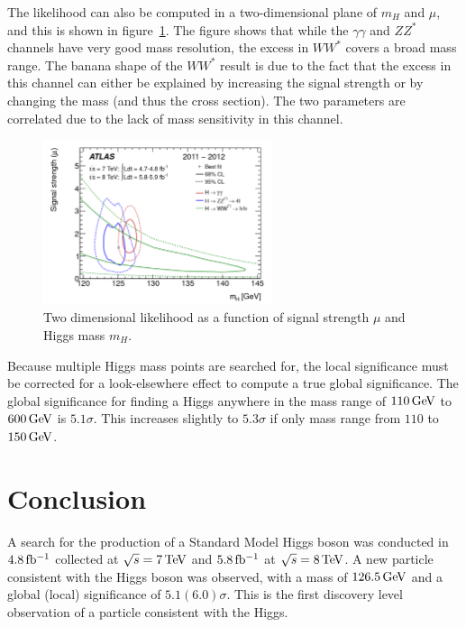The likelihood can also be computed in a two-dimensional plane of $m_{H}$ and $\mu$, and this is shown in figure~\ref{fig:disc_2d}. The figure shows that while the $\gamma\gamma$ and $ZZ^*$ channels have very good mass resolution, the excess in $WW^*$ covers a broad mass range. The banana shape of the $WW^*$ result is due to the fact that the excess in this channel can either be explained by increasing the signal strength or by changing the mass (and thus the cross section). The two parameters are correlated due to the lack of mass sensitivity in this channel. 

\begin{figure}[h!]
  \centering
  \captionsetup{justification=centering}
  \includegraphics[width=0.6\textwidth]{figures/disc_2d}
  \caption{Two dimensional likelihood as a function of signal strength $\mu$ and Higgs mass $m_H$\cite{Discovery}.}
  \label{fig:disc_2d}
\end{figure}

Because multiple Higgs mass points are searched for, the local significance must be corrected for a look-elsewhere effect to compute a true global significance. The global significance for finding a Higgs anywhere in the mass range of $110 \GeV$ to $600 \GeV$ is $5.1\sigma$. This increases slightly to $5.3\sigma$ if only mass range from $110$ to $150 \GeV$. 

\section{Conclusion}

A search for the production of a Standard Model Higgs boson was conducted in $4.8 \mbox{\,fb$^{-1}$}$ collected at $\sqrt{s} = 7 \TeV$ and $5.8 \mbox{\,fb$^{-1}$}$ at $\sqrt{s} = 8 \TeV$. A new particle consistent with the Higgs boson was observed, with a mass of $126.5 \GeV$ and a global (local) significance of $5.1 (6.0)\sigma$. This is the first discovery level observation of a particle consistent with the Higgs. 

